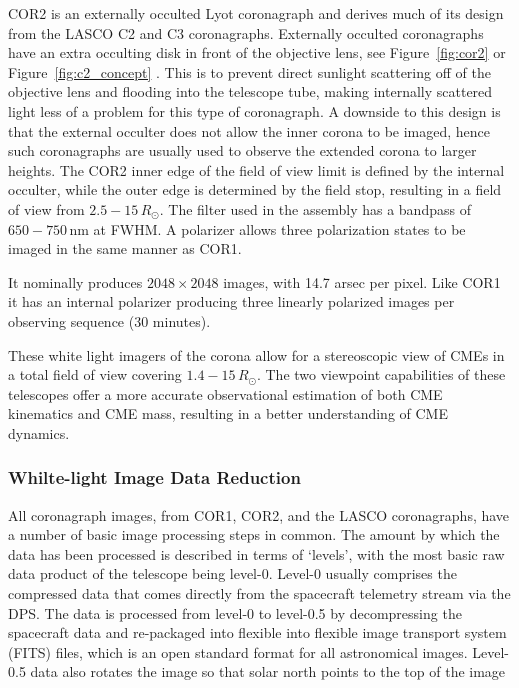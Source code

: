 COR2 is an externally occulted Lyot coronagraph and derives much of its design from the LASCO C2 and C3 coronagraphs. Externally occulted coronagraphs have an extra occulting disk in front of the objective lens, see Figure~\ref{fig:cor2} or Figure~\ref{fig:c2_concept} . This is to prevent direct sunlight scattering off of the objective lens and flooding into the telescope tube, making internally scattered light less of a problem for this type of coronagraph. A downside to this design is that the external occulter does not allow the inner corona to be imaged, hence such coronagraphs are usually used to observe the extended corona to larger heights. The COR2 inner edge of the field of view limit is defined by the internal occulter, while the outer edge is determined by the field stop, resulting in a field of view from $2.5 - 15\,R_{\odot}$. The filter used in the assembly has a bandpass of $650 - 750$\,nm at FWHM. A polarizer allows three polarization states to be imaged in the same manner as COR1.


It nominally produces $2048\times2048$ images, with 14.7 arsec per pixel. Like COR1 it has an internal polarizer producing three linearly polarized images per observing sequence (30 minutes).

These white light imagers of the corona allow for a stereoscopic view of CMEs in a total field of view covering $1.4 - 15\,R_{\odot}$. The two viewpoint capabilities of these telescopes offer a more accurate observational estimation of both CME kinematics and CME mass, resulting in a better understanding of CME dynamics.

\subsubsection{Whilte-light Image Data Reduction}

All coronagraph images, from COR1, COR2, and the LASCO coronagraphs, have a number of basic image processing steps in common. The amount by which the data has been processed is described in terms of `levels', with the most basic raw data product of the telescope being level-0. Level-0 usually comprises the compressed data that comes directly from the spacecraft telemetry stream via the DPS. The data is processed from level-0 to level-0.5 by decompressing the spacecraft data and re-packaged into flexible into flexible image transport system (FITS) files, which is an open standard format for all astronomical images. Level-0.5 data also rotates the image so that solar north points to the top of the image

